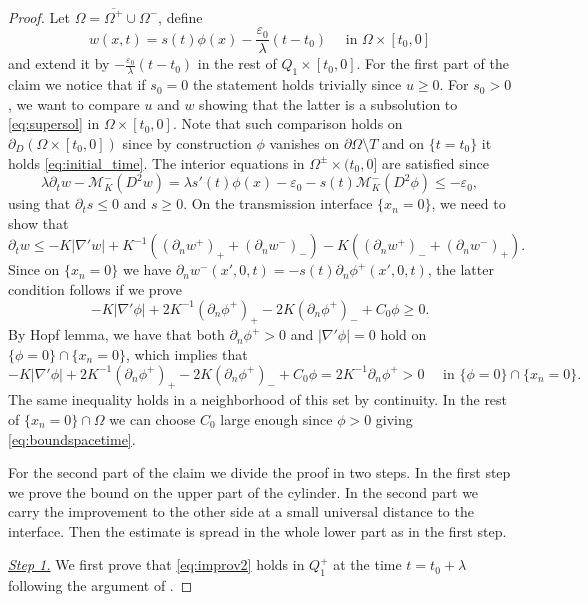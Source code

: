 \documentclass[12pt]{article}
\numberwithin{Theorem}{section}
\theoremstyle{definition}
\theoremstyle{remark}
\numberwithin{equation}{section}
\newcommand{\p}{\partial}
\newcommand{\eps}{\varepsilon}
\begin{document}
\begin{proof} 
    Let $\Omega= \overline{\Omega^+} \cup \Omega^-$, define 
    \[
    w(x,t)=s(t)\phi(x)-\frac{\eps_0}{\lambda}(t-t_0) \quad \text{ in } \Omega \times [t_0,0] \] 
    and extend it by $-\frac{\eps_0}{\lambda}(t-t_0)$ in the rest of $Q_1 \times [t_0,0]$. For the first part of the claim we notice that if $s_0=0$ the statement holds trivially since $u \geq 0$.  For $s_0>0$, we want to compare $u$ and $w$ showing that the latter is a subsolution to \eqref{eq:supersol} in $\Omega \times [t_0,0]$. Note that  such comparison holds on $\p_D \left( \Omega \times [t_0,0]\right)$ since by construction $\phi$ vanishes on $ \p \Omega \setminus T$ and on $\{t=t_0 \}$ it  holds \eqref{eq:initial_time}.
    The interior equations in $\Omega^\pm \times (t_0,0]$ are satisfied since 
    \[
    \lambda \p_t w - \mathcal M_K^- (D^2 w) = \lambda s'(t) \phi(x) - \eps_0 - s(t)\mathcal M_K^- (D^2 \phi) \leq -\eps_0,
    \]
    using that $\p_t s \leq 0$ and $s\geq 0$.  On the transmission interface $\{ x_n=0\}$, we need to show that 
    \[ 
    \p_t w \leq -K |\nabla' w| + K^{-1}\left( (\p_n w^+)_+ + (\p_n w^-)_- \right) - K\left( (\p_n w^+)_- + (\p_n w^-)_+ \right). 
    \]
    Since on $\{ x_n=0\}$ we have $ \p_n w^-(x',0,t)=-s(t) \p_n \phi^+(x',0,t)$, the latter condition follows if we prove
    \[
    -K|\nabla' \phi| +2K^{-1} (\p_n \phi^+)_+ - 2K ( \p_n \phi^+)_- + C_0 \phi \geq 0.
    \]
    By Hopf lemma, we have that both $\p_n \phi^+ > 0$ and $|\nabla'\phi|=0$ hold on $\{ \phi = 0 \} \cap \{x_n = 0 \}$, which implies that
    \[
    -K|\nabla' \phi| +2K^{-1} (\p_n \phi^+)_+ - 2K (\p_n \phi^+)_- + C_0 \phi = 2K^{-1} \p_n \phi^+ >0 \quad \text{ in }\{ \phi = 0 \} \cap \{x_n = 0 \}. 
    \]
    The same inequality holds in a neighborhood of this set by continuity. In the rest of $\{x_n= 0\} \cap \Omega$ we can choose $C_0$ large enough since $\phi >0$ giving \eqref{eq:boundspacetime}.
    
    For the second part of the claim we divide the proof in two steps. In the first step we prove the bound on the upper part of the cylinder. In the second part we carry the improvement to the other side at a small universal distance to the interface. Then the estimate is spread in the whole lower part as in the first step.

\underline{\textit{Step 1.}} We first prove that \eqref{eq:improv2} holds in $Q_1^+$ at the time $t=t_0+\lambda$ following the argument of \cite[Lemma 6.2]{DFS23}.


\end{proof}
\end{document}
